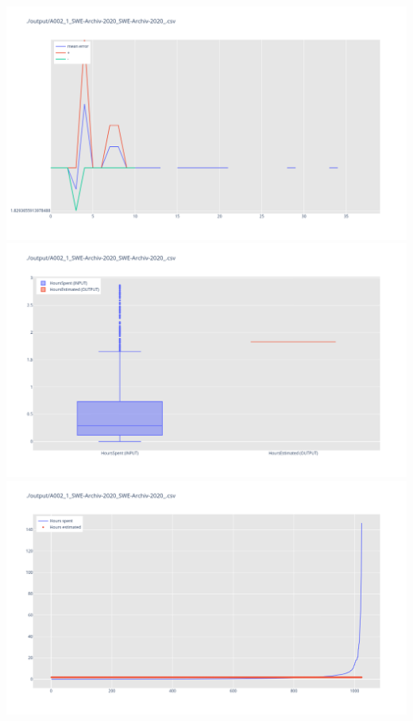 \includegraphics[width=\textwidth]{Scripts/output/A002_1_SWE-Archiv-2020_SWE-Archiv-2020_.csv.error_distribution.png}
\includegraphics[width=\textwidth]{Scripts/output/A002_1_SWE-Archiv-2020_SWE-Archiv-2020_.csv.png}
\includegraphics[width=\textwidth]{Scripts/output/A002_1_SWE-Archiv-2020_SWE-Archiv-2020_.csv.scatter.png}
